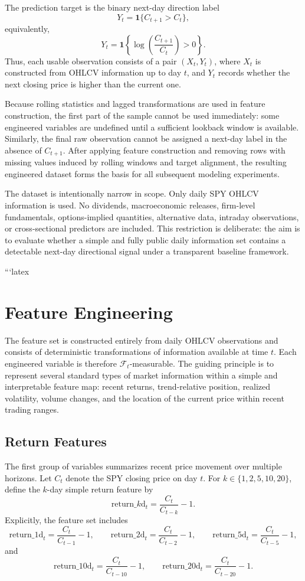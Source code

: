 \documentclass[11pt,a4paper]{article}
\begin{document}
	The prediction target is the binary next-day direction label
	\[
	Y_t = \mathbf{1}\{C_{t+1} > C_t\},
	\]
	equivalently,
	\[
	Y_t = \mathbf{1}\left\{\log\!\left(\frac{C_{t+1}}{C_t}\right) > 0\right\}.
	\]
	Thus, each usable observation consists of a pair \((X_t,Y_t)\), where \(X_t\) is constructed from OHLCV information up to day \(t\), and \(Y_t\) records whether the next closing price is higher than the current one.
	
	Because rolling statistics and lagged transformations are used in feature construction, the first part of the sample cannot be used immediately: some engineered variables are undefined until a sufficient lookback window is available. Similarly, the final raw observation cannot be assigned a next-day label in the absence of \(C_{t+1}\). After applying feature construction and removing rows with missing values induced by rolling windows and target alignment, the resulting engineered dataset forms the basis for all subsequent modeling experiments.
	
	The dataset is intentionally narrow in scope. Only daily SPY OHLCV information is used. No dividends, macroeconomic releases, firm-level fundamentals, options-implied quantities, alternative data, intraday observations, or cross-sectional predictors are included. This restriction is deliberate: the aim is to evaluate whether a simple and fully public daily information set contains a detectable next-day directional signal under a transparent baseline framework.
	
	```latex
	\section{Feature Engineering}
	
	The feature set is constructed entirely from daily OHLCV observations and consists of deterministic transformations of information available at time \(t\). Each engineered variable is therefore \(\mathcal{F}_t\)-measurable. The guiding principle is to represent several standard types of market information within a simple and interpretable feature map: recent returns, trend-relative position, realized volatility, volume changes, and the location of the current price within recent trading ranges.
	
	\subsection{Return Features}
	
	The first group of variables summarizes recent price movement over multiple horizons. Let \(C_t\) denote the SPY closing price on day \(t\). For \(k \in \{1,2,5,10,20\}\), define the \(k\)-day simple return feature by
	\[
	\text{return\_}k\text{d}_t = \frac{C_t}{C_{t-k}} - 1.
	\]
	Explicitly, the feature set includes
	\[
	\text{return\_1d}_t = \frac{C_t}{C_{t-1}} - 1,\qquad
	\text{return\_2d}_t = \frac{C_t}{C_{t-2}} - 1,\qquad
	\text{return\_5d}_t = \frac{C_t}{C_{t-5}} - 1,
	\]
	and
	\[
	\text{return\_10d}_t = \frac{C_t}{C_{t-10}} - 1,\qquad
	\text{return\_20d}_t = \frac{C_t}{C_{t-20}} - 1.
	\]
	
\end{document}
